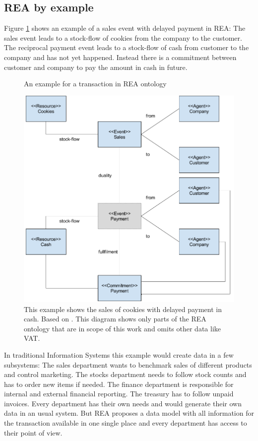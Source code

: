 \subsection*{REA by example}

Figure \ref{fig:REA-simple-sample} shows an example of a sales event with delayed payment in REA: The sales event leads to a stock-flow of cookies from the company to the customer. The reciprocal payment event leads to a stock-flow of cash from customer to the company and has not yet happened. Instead there is a commitment between customer and company to pay the amount in cash in future.

\begin{figure}

\centering
\caption{An example for a transaction in REA ontology}
\label{fig:REA-simple-sample}
\includegraphics[width=0.6\linewidth]{"../figures/Extended REA Example"}
\caption*{This example shows the sales of cookies with delayed payment in cash. Based on \cite{mccarthy2004elmo-cookie-monster}. This diagram shows only parts of the REA ontology that are in scope of this work and omits other data like VAT.}
\end{figure}

In traditional Information Systems this example would create data in a few subsystems:
The sales department wants to benchmark sales of different products and control marketing.
The stocks department needs to follow stock counts and has to order new items if needed.
The finance department is responsible for internal and external financial reporting.
The treasury has to follow unpaid invoices.
Every department has their own needs and would generate their own data in an usual system.
But REA proposes a data model with all information for the transaction available in one single place and every department has access to their point of view.

